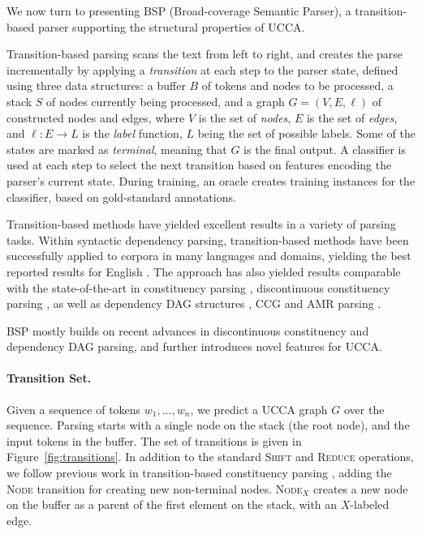 \documentclass[11pt]{article}
\newcommand{\figref}[1]{Figure~\ref{#1}}
\begin{document}
We now turn to presenting BSP (Broad-coverage Semantic Parser),
a transition-based parser supporting the structural properties of UCCA.

Transition-based parsing \cite{Nivre03anefficient} scans the text from left to right,
and creates the parse incrementally by applying a \textit{transition}
at each step to the parser state,
defined using three data structures: a buffer $B$ of tokens and nodes to be processed,
a stack $S$ of nodes currently being processed,
and a graph $G=(V,E,\ell)$ of constructed nodes and edges,
where $V$ is the set of \emph{nodes}, $E$ is the set of \emph{edges},
and $\ell : E \to L$ is the \emph{label} function, $L$ being the set of possible labels.
Some of the states are marked as \textit{terminal}, meaning that $G$ is the final output.
A classifier is used at each step to select the next transition based on features
encoding the parser's current state.
During training, an oracle creates training instances for the classifier,
based on gold-standard annotations.

Transition-based methods have yielded excellent
results in a variety of parsing tasks.
Within syntactic dependency parsing, transition-based methods
have been successfully applied to corpora in many languages and domains, yielding
the best reported results for English
\cite{dyer2015transition,andor2016globally,kiperwasser2016simple}.
The approach has also yielded results comparable with the state-of-the-art in
constituency parsing \cite{sagae2005classifier,zhang2009transition,zhu2013fast},
discontinuous constituency parsing \cite{maier-lichte:2016:DiscoNLP},
as well as dependency DAG structures
\cite{sagae2008shift,ribeyre-villemontedelaclergerie-seddah:2014:SemEval,tokgoz2015transition},
CCG \cite{ambati2015incremental}
and AMR parsing \cite{wang-EtAl:2016:SemEval}.

BSP mostly builds on recent advances in discontinuous constituency
and dependency DAG parsing, and further introduces novel features for UCCA.

\paragraph{Transition Set.}
Given a sequence of tokens $w_1, \ldots, w_n$, we predict a UCCA graph $G$ over the sequence.
Parsing starts with a single node on the stack (the root node), and the input tokens
in the buffer. The set of transitions is given in \figref{fig:transitions}.
In addition to the standard \textsc{Shift} and \textsc{Reduce} operations, 
we follow previous work in transition-based constituency parsing \cite{sagae2005classifier},
adding the \textsc{Node} transition for creating new non-terminal nodes.
\textsc{Node$_X$} creates a new node on the buffer as a parent of the first element on the stack, with an $X$-labeled edge.
\end{document}
